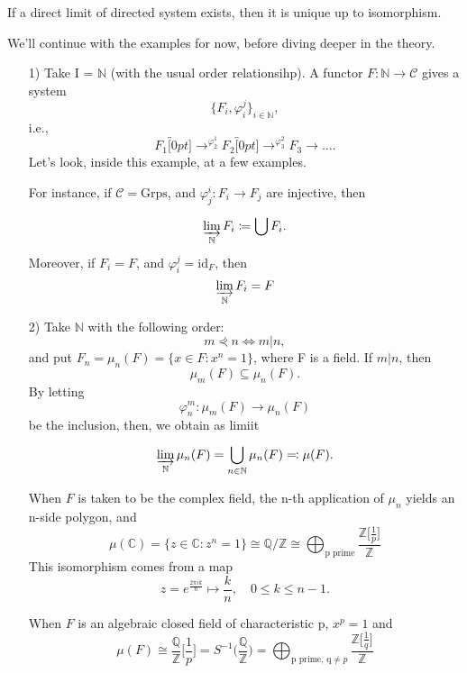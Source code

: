 \documentclass[../category_theory.tex]{subfiles}
\begin{document}
\begin{exr}
	If a direct limit of  directed system exists, then it is unique up to isomorphism.
\end{exr}
We'll continue with the examples for now, before diving deeper in the theory.
\begin{example}
	\begin{itemize}
		\item[1)] Take I = \(\mathbb{N}\) (with the usual order relationsihp). A functor \(F:\mathbb{N}\rightarrow \mathcal{C}\) gives a system
		      \[
			      \{F_{i}, \varphi_{i}^{j}\}_{i\in \mathbb{N}},
		      \]
		      i.e.,
		      \[
			      F_{1}\overbracket[0pt]{\rightarrow}^{\varphi_{2}^{1}}F_{2}\overbracket[0pt]{\rightarrow}^{\varphi_{3}^{2}}F_{3}\rightarrow \dotsc .
		      \]
		      Let's look, inside this example, at a few examples.


		      For instance, if \(\mathcal{C}=\mathrm{Grps}\), and \(\varphi_{j}^{i}:F_{i}\rightarrow F_{j} \) are injective, then
		      \[
			      \varinjlim_{\mathbb{N}}F_{i}\coloneqq \bigcup_{}^{}F_{i}.
		      \]
		      Moreover, if \(F_{i}=F\), and \(\varphi_{i}^{j}=\mathrm{id}_{F}\), then
		      \[
			      \varinjlim_{\mathbb{N}}F_{i}=F
		      \]
		\item[2)] Take \(\mathbb{N}\) with the following order:
		      \[
			      m\curlyeqprec n \Longleftrightarrow m|n,
		      \]
		      and put \(F_{n}=\mu_{n}(F)=\{x\in F:x^{n}=1\}\), where F is a field. If \(m|n\), then
		      \[
			      \mu_{m}(F)\subseteq \mu_{n}(F).
		      \]
		      By letting
		      \[
			      \varphi _{n}^{m}:\mu_{m}(F)\rightarrow \mu_{n}(F)
		      \]
		      be the inclusion, then, we obtain as limiit
		      \[
			      \varinjlim_{\mathbb{N}}\mu_{n}(F)=\bigcup_{n\in \mathbb{N}}^{}\mu_{n}(F)\eqqcolon \mu(F).
		      \]

		      When \(F\) is taken to be the complex field, the n-th application of \(\mu_{n}\) yields an n-side polygon, and
		      \[
			      \mu(\mathbb{C})=\{z\in \mathbb{C}: z^{n}=1\}\cong \mathbb{Q}/\mathbb{Z}\cong \bigoplus_{\text{p prime}} \frac{\mathbb{Z}\biggl[\frac{1}{p}\biggr]}{\mathbb{Z}}
		      \]
		      This isomorphism comes from a map
		      \[
			      z=e^{\frac{2\pi i k}{n}}\mapsto \frac{k}{n},\quad 0\leq k\leq n-1.
		      \]

		      When \(F\) is an algebraic closed field of characteristic p, \(x^{p}=1\) and
		      \[
			      \mu (F)\cong \frac{\mathbb{Q}}{\mathbb{Z}}\biggl[\frac{1}{p}\biggr] = S^{-1}\biggl(\frac{\mathbb{Q}}{\mathbb{Z}}\biggr) =\bigoplus_{\text{p prime, q}\neq p}\frac{\mathbb{Z}\biggl[\frac{1}{q}\biggr]}{\mathbb{Z}}
		      \]
	\end{itemize}
\end{example}
\end{document}
